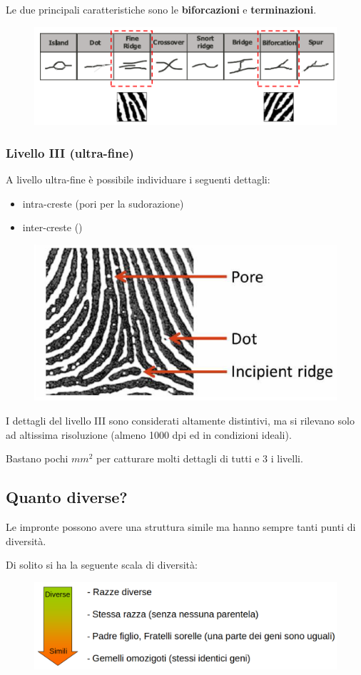 \noindent Le due principali caratteristiche sono le \textbf{biforcazioni} e \textbf{terminazioni}.
\begin{figure}[ht]
    \centering
    \includegraphics[width=0.75\linewidth]{chapters/images-chap5/caratteristiche.png}
\end{figure}

\subsubsection{Livello III (ultra-fine)}
A livello ultra-fine è possibile individuare i seguenti dettagli:
\begin{itemize}
    \item intra-creste (pori per la sudorazione)
    \item inter-creste ()
\end{itemize}

\begin{figure}[ht]
    \centering
    \includegraphics[width=0.5\linewidth]{chapters/images-chap5/livello3.png}
\end{figure}

\noindent I dettagli del livello III sono
considerati altamente distintivi,
ma si rilevano solo ad altissima
risoluzione (almeno 1000 dpi
ed in condizioni ideali).

\noindent Bastano pochi $mm^2$ per catturare molti dettagli di tutti e 3 i livelli.

\subsection{Quanto diverse?}

Le impronte possono avere una struttura simile ma hanno sempre tanti
punti di diversità.

\noindent Di solito si ha la seguente scala di diversità:
\begin{figure}[ht]
    \centering
    \includegraphics[width=1\linewidth]{chapters/images-chap5/diversita.png}
\end{figure}

